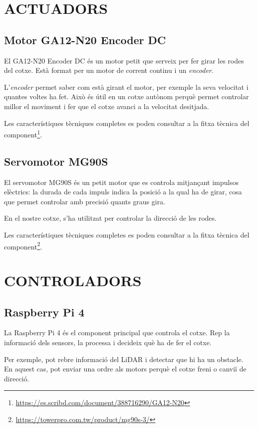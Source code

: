 \documentclass[11pt,a4paper]{article}
\let\origsection\section
\renewcommand{\section}{\clearpage\origsection}
\begin{document}
\section{ACTUADORS}

\subsection{Motor GA12-N20 Encoder DC}

El GA12-N20 Encoder DC és un motor petit que serveix per fer girar les rodes del cotxe. Està format per un motor de corrent continu i un \emph{encoder}.

L’\emph{encoder} permet saber com està girant el motor, per exemple la seva velocitat i quantes voltes ha fet. Això és útil en un cotxe autònom perquè permet controlar millor el moviment i fer que el cotxe avanci a la velocitat desitjada.

Les característiques tècniques completes es poden consultar a la fitxa tècnica del component\footnote{\url{https://es.scribd.com/document/388716290/GA12-N20}}.

\subsection{Servomotor MG90S}

El servomotor MG90S és un petit motor que es controla mitjançant impulsos elèctrics: la durada de cada impuls indica la posició a la qual ha de girar, cosa que permet controlar amb precisió quants graus gira.

En el nostre cotxe, s’ha utilitzat per controlar la direcció de les rodes.

Les característiques tècniques completes es poden consultar a la fitxa tècnica del component\footnote{\url{https://towerpro.com.tw/product/mg90s-3/}}.

\section{CONTROLADORS}

\subsection{Raspberry Pi 4}

La Raspberry Pi 4 és el component principal que controla el cotxe. Rep la informació dels sensors, la processa i decideix què ha de fer el cotxe.

Per exemple, pot rebre informació del LiDAR i detectar que hi ha un obstacle. En aquest cas, pot enviar una ordre als motors perquè el cotxe freni o canviï de direcció.
\end{document}
